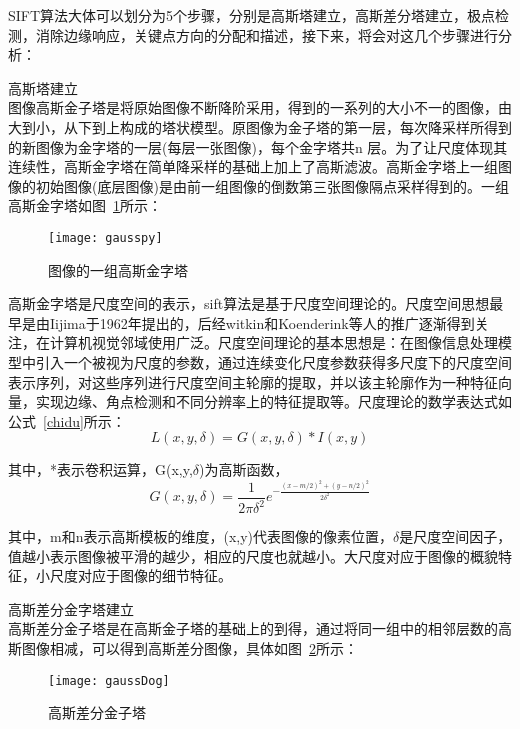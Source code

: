 SIFT算法大体可以划分为5个步骤，分别是高斯塔建立，高斯差分塔建立，极点检测，消除边缘响应，关键点方向的分配和描述，接下来，将会对这几个步骤进行分析：
\begin{compactenum}
\item 高斯塔建立\\图像高斯金子塔是将原始图像不断降阶采用，得到的一系列的大小不一的图像，由大到小，从下到上构成的塔状模型。原图像为金子塔的第一层，每次降采样所得到的新图像为金字塔的一层(每层一张图像)，每个金字塔共n 层。为了让尺度体现其连续性，高斯金字塔在简单降采样的基础上加上了高斯滤波。高斯金字塔上一组图像的初始图像(底层图像)是由前一组图像的倒数第三张图像隔点采样得到的。一组高斯金字塔如图~\ref{fig:gausspy}所示：
\begin{figure}[htp]
\centering
\texttt{[image: gausspy]}
\caption{图像的一组高斯金字塔}
\label{fig:gausspy}
\end{figure}

高斯金字塔是尺度空间的表示，sift算法是基于尺度空间理论的。尺度空间思想最早是由Iijima于1962年提出的，后经witkin和Koenderink等人的推广逐渐得到关注，在计算机视觉邻域使用广泛。尺度空间理论的基本思想是：在图像信息处理模型中引入一个被视为尺度的参数，通过连续变化尺度参数获得多尺度下的尺度空间表示序列，对这些序列进行尺度空间主轮廓的提取，并以该主轮廓作为一种特征向量，实现边缘、角点检测和不同分辨率上的特征提取等。尺度理论的数学表达式如公式~\ref{chidu}所示：
\begin{equation}\label{chidu}
L(x,y,\delta)=G(x,y,\delta)*I(x,y)
\end{equation}

其中，*表示卷积运算，G(x,y,$\delta$)为高斯函数，
\begin{equation}\label{gauss}
G(x,y,\delta)=\frac{1}{2\pi{\delta}^2}e^{-\frac{(x-m/2)^2+(y-n/2)^2}{2\delta^2}}
\end{equation}

其中，m和n表示高斯模板的维度，(x,y)代表图像的像素位置，$\delta$是尺度空间因子，值越小表示图像被平滑的越少，相应的尺度也就越小。大尺度对应于图像的概貌特征，小尺度对应于图像的细节特征。

\item 高斯差分金字塔建立\\高斯差分金子塔是在高斯金子塔的基础上的到得，通过将同一组中的相邻层数的高斯图像相减，可以得到高斯差分图像，具体如图~\ref{fig:gaussDog}所示：
\begin{figure}[htp]
\centering
\texttt{[image: gaussDog]}
\caption{高斯差分金子塔}
\label{fig:gaussDog}
\end{figure}


\end{compactenum}
